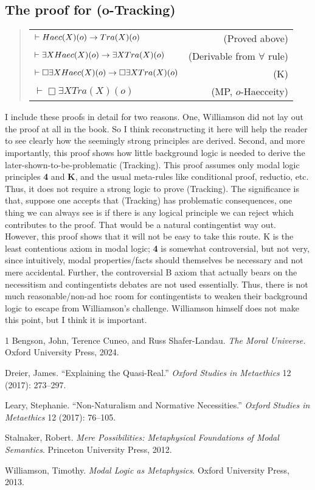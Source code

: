 \subsection{The proof for (o-Tracking)} 
\begin{quote}
\begin{tabulary}{\textwidth}{p{0.705\textwidth}R}
$\vdash Haec(X)(o) \rightarrow Tra(X)(o)$ & (Proved above) \\
$\vdash \exists X Haec(X)(o) \rightarrow \exists X Tra(X)(o)$ & (Derivable from $\forall$ rule) \\
$\vdash \Box \exists X Haec(X)(o) \rightarrow \Box \exists X Tra(X)(o)$ & (K)\\
$\vdash \Box \exists X Tra(X)(o)$ & (MP, $o$-Haecceity) 
\end{tabulary}
\end{quote}


\noindent I include these proofs in detail for two reasons. One, Williamson did not lay out the proof at all in the book. So I think reconstructing it here will help the reader to see clearly how the seemingly strong principles are derived. Second, and more importantly, this proof shows how little background logic is needed to derive the later-shown-to-be-problematic (Tracking). This proof assumes only modal logic principles \textbf{4} and \textbf{K}, and the usual meta-rules like conditional proof, reductio, etc. Thus, it  does not require a strong logic to prove (Tracking). The significance is that, suppose one accepts that (Tracking) has problematic consequences, one thing we can always see is if there is any logical principle we can reject which contributes to the proof. That would be a natural contingentist way out. However, this proof shows that it will not be easy to take this route. K is the least contentious axiom in modal logic; \textbf{4} is somewhat controversial, but not very, since intuitively, modal properties/facts should themselves be necessary and not mere accidental. Further, the controversial B axiom that actually bears on the necessitism and contingentists debates are not used essentially. Thus, there is not much reasonable/non-ad hoc room for contingentists to weaken their background logic to escape from Williamson's challenge. Williamson himself does not make this point, but I think it is important. 


\begin{hangparas}{\hangingindent}{1}
  Bengson, John, Terence Cuneo, and Russ Shafer-Landau. \textit{The Moral Universe.} Oxford University Press, 2024.

  Dreier, James. ``Explaining the Quasi-Real.'' \textit{Oxford Studies in Metaethics} 12 (2017): 273--297.

  Leary, Stephanie. ``Non-Naturalism and Normative Necessities.'' \textit{Oxford Studies in Metaethics} 12 (2017): 76--105.

  Stalnaker, Robert. \textit{Mere Possibilities: Metaphysical Foundations of Modal Semantics}. Princeton University Press, 2012.

  Williamson, Timothy. \textit{Modal Logic as Metaphysics}. Oxford University Press, 2013.
  \end{hangparas}
